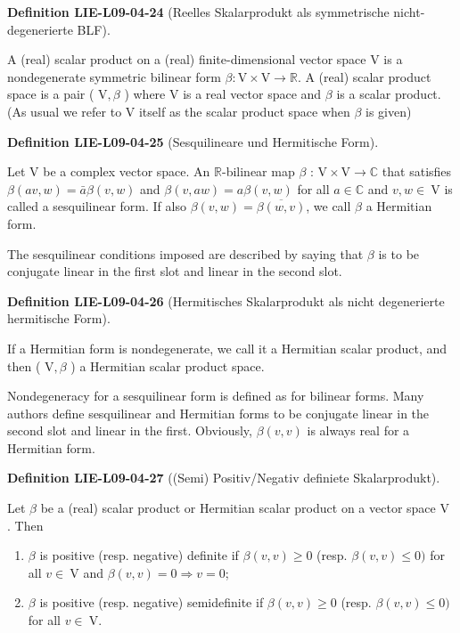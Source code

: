 \documentclass[10pt, letterpaper]{article}
\newcommand{\CustomHeading}[3]{%
  \par\medskip\noindent%
  \textbf{#1 #2} \textnormal{(#3)}.\enskip%
}
\newenvironment{DEF}[2]{\CustomHeading{Definition}{#1}{#2}}{}
\begin{document}
\begin{DEF}{LIE-L09-04-24}{Reelles Skalarprodukt als symmetrische nicht-degenerierte BLF}
A (real) scalar product on a (real) finite-dimensional vector space V is a nondegenerate symmetric bilinear form $\beta: \mathrm{V} \times \mathrm{V} \rightarrow \mathbb{R}$. A (real) scalar product space is a pair ( $\mathrm{V}, \beta$ ) where V is a real vector space and $\beta$ is a scalar product. (As usual we refer to V itself as the scalar product space when $\beta$ is given)
\end{DEF}

\begin{DEF}{LIE-L09-04-25}{Sesquilineare und Hermitische Form}
Let V be a complex vector space. An $\mathbb{R}$-bilinear map $\beta$ : $\mathrm{V} \times \mathrm{V} \rightarrow \mathbb{C}$ that satisfies $\beta(a v, w)=\bar{a} \beta(v, w)$ and $\beta(v, a w)=a \beta(v, w)$ for all $a \in \mathbb{C}$ and $v, w \in \mathrm{~V}$ is called a sesquilinear form. If also $\beta(v, w)=\overline{\beta(w, v)}$, we call $\beta$ a Hermitian form.

The sesquilinear conditions imposed are described by saying that $\beta$ is to be conjugate linear in the first slot and linear in the second slot.
\end{DEF}

\begin{DEF}{LIE-L09-04-26}{Hermitisches Skalarprodukt als nicht degenerierte hermitische Form}
If a Hermitian form is nondegenerate, we call it a Hermitian scalar product, and then ( $\mathrm{V}, \beta$ ) a Hermitian scalar product space.

Nondegeneracy for a sesquilinear form is defined as for bilinear forms. Many authors define sesquilinear and Hermitian forms to be conjugate linear in the second slot and linear in the first. Obviously, $\beta(v, v)$ is always real for a Hermitian form.
\end{DEF}

\begin{DEF}{LIE-L09-04-27}{(Semi) Positiv/Negativ definiete Skalarprodukt}
Let $\beta$ be a (real) scalar product or Hermitian scalar product on a vector space V . Then
\begin{enumerate}
\item $\beta$ is positive (resp. negative) definite if $\beta(v, v) \geq 0$ (resp. $\beta(v, v) \leq 0)$ for all $v \in \mathrm{~V}$ and $\beta(v, v)=0 \Longrightarrow v=0$;

\item $\beta$ is positive (resp. negative) semidefinite if $\beta(v, v) \geq 0$ (resp. $\beta(v, v) \leq 0)$ for all $v \in \mathrm{~V}$.
\end{enumerate}
\end{DEF}
\end{document}
